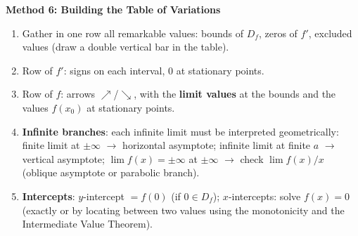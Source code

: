 \documentclass[11pt]{article}
\begin{document}
\textbf{Method 6: Building the Table of Variations}\par

\begin{methode}
\begin{enumerate}
\item Gather in one row all remarkable values: bounds of $D_f$, zeros of $f'$, excluded values (draw a double vertical bar in the table).
\item Row of $f'$: signs on each interval, $0$ at stationary points.
\item Row of $f$: arrows $\nearrow$/$\searrow$, with the \textbf{limit values} at the bounds and the values $f(x_0)$ at stationary points.
\item \textbf{Infinite branches}: each infinite limit must be interpreted geometrically: finite limit at $\pm\infty$ $\to$ horizontal asymptote; infinite limit at finite $a$ $\to$ vertical asymptote; $\lim f(x)=\pm\infty$ at $\pm\infty$ $\to$ check $\lim f(x)/x$ (oblique asymptote or parabolic branch).
\item \textbf{Intercepts}: $y$-intercept $=f(0)$ (if $0\in D_f$); $x$-intercepts: solve $f(x)=0$ (exactly or by locating between two values using the monotonicity and the Intermediate Value Theorem).
\end{enumerate}
\end{methode}
\end{document}
